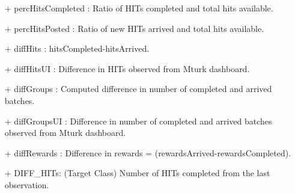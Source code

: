\begin{itemize}[noitemsep,topsep=0pt,parsep=0pt,partopsep=0pt]
\item[+] percHitsCompleted : Ratio of HITs completed and total hits available.
\item[+] percHitsPosted : Ratio of new HITs arrived and total hits available.
\item[+] diffHits : hitsCompleted-hitsArrived.
\item[+] diffHitsUI : Difference in HITs observed from Mturk dashboard.
\item[+] diffGroups  : Computed difference in number of completed and arrived batches.
\item[+] diffGroupsUI : Difference in number of completed and arrived batches observed from Mturk dashboard.
\item[+] diffRewards : Difference in rewards = (rewardsArrived-rewardsCompleted).
\item[+] DIFF\_HITs:  (Target Class) Number of HITs completed from the last observation.
\end{itemize}
